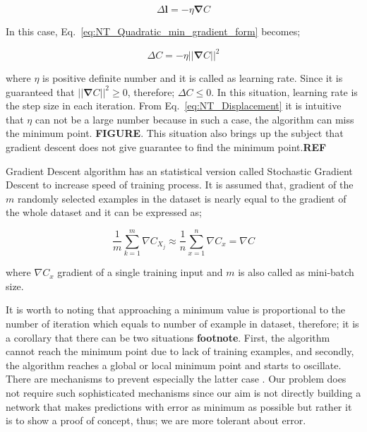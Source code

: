 \documentclass[a4paper,times,12pt]{article}
\begin{document}
\begin{equation}
\label{eq:NT_learning_rate}
\Delta{\boldsymbol{l}} = -\eta\boldsymbol{\nabla}C
\end{equation}

\noindent In this case, Eq.~\ref{eq:NT_Quadratic_min_gradient_form} becomes;

\begin{equation}
\label{eq:NT_Displacement}
\Delta{C} = -\eta ||\boldsymbol{\nabla}{C}||^2
\end{equation}

\noindent where $\eta$ is positive definite number and it is called as learning rate. Since it is guaranteed that $||\boldsymbol{\nabla}{C}||^2 \geq 0$, therefore; $\Delta{C} \leq 0$. In this situation, learning rate is the step size in each iteration. From Eq.~\ref{eq:NT_Displacement} it is intuitive that $\eta$ can not be a large number because in such a case, the algorithm can miss the minimum point. \textbf{FIGURE}. This situation also brings up the subject that gradient descent does not give guarantee to find the minimum point.{\textbf{REF}} 

Gradient Descent algorithm has an statistical version called Stochastic Gradient Descent to increase speed of training process. It is assumed that, gradient of the $m$ randomly selected examples in the dataset is nearly equal to the gradient of the whole dataset and it can be expressed as;

\begin{equation}
\label{eq:NT_Stochastic}
\frac{1}{m} \sum\limits_{k = 1}^{m} \nabla{C_{X_j}} \approx \frac{1}{n}\sum\limits_{x = 1}^{n} \nabla{C_{x}} = \nabla{C}
\end{equation}

\noindent where $\nabla{C_x}$ gradient of a single training input and $m$ is also called as mini-batch size.

It is worth to noting that approaching a minimum value is proportional to the number of iteration which equals to number of example in dataset, therefore; it is a corollary that there can be two situations \textbf{footnote}. First, the algorithm cannot reach the minimum point due to lack of training examples, and secondly, the algorithm reaches a global or local minimum point and starts to oscillate. There are mechanisms to prevent especially the latter case \cite{zeiler2012adadelta}. Our problem does not require such sophisticated mechanisms since our aim is not directly building a network that makes predictions with error as minimum as possible but rather it is to show a proof of concept, thus; we are more tolerant about error.
\end{document}
